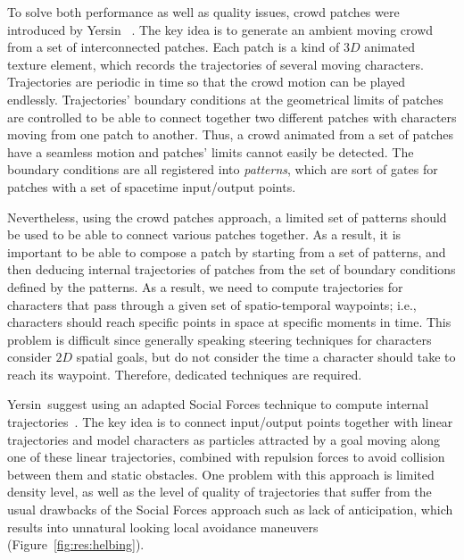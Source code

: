 To solve both performance as well as quality issues, crowd patches were introduced by Yersin \etal~\cite{Yersin:2009}.
The key idea is to generate an ambient moving crowd from a set of interconnected patches.
Each patch is a kind of $3D$ animated texture element, which records the trajectories of several moving characters.
Trajectories are periodic in time so that the crowd motion can be played endlessly.
Trajectories' boundary conditions at the geometrical limits of patches are controlled to be able to connect together two different patches with characters moving from one patch to another.
Thus, a crowd animated from a set of patches have a seamless motion and patches' limits cannot easily be detected.
The boundary conditions are all registered into {\it patterns}, which are sort of gates for patches with a set of spacetime input/output points.

Nevertheless, using the crowd patches approach, a limited set of patterns should be used to be able to connect various patches together.
As a result, it is important to be able to compose a patch by starting from a set of patterns, and then deducing internal trajectories of patches from the set of boundary conditions defined by the patterns.
As a result, we need to compute trajectories for characters that pass through a given set of spatio-temporal waypoints; i.e., characters should reach specific points in space at specific moments in time.
This problem is difficult since generally speaking steering techniques for characters consider $2D$ spatial goals, but do not consider the time a character should take to reach its waypoint.
Therefore, dedicated techniques are required. 

Yersin~\etal suggest using an adapted Social Forces technique to compute internal trajectories~\cite{Helbing:2005}.
The key idea is to connect input/output points together with linear trajectories and model characters as particles attracted by a goal moving along one of these linear trajectories, combined with repulsion forces to avoid collision between them and static obstacles.
One problem with this approach is limited density level, as well as the level of quality of trajectories that suffer from the usual drawbacks of the Social Forces approach such as lack of anticipation, which results into unnatural looking local avoidance maneuvers (Figure~\ref{fig:res:helbing}).

